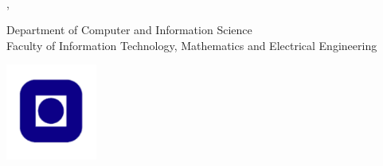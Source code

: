 \clearpage
\begin{titlepage}
    \noindent {\large \textbf{\thesisAuthor}}
    \vspace{2cm}
    
    \noindent {\Huge \thesisTitle} \\
    \noindent {\Large \it \thesisSubTitle}
    \vspace{2cm}
    
    \noindent \thesisType, \thesisDate 
    \vspace{2cm}
    
    \noindent Department of Computer and Information Science\\ Faculty of Information Technology, Mathematics and Electrical Engineering\\
    
    \vfill
    \begin{center}
    \includegraphics[width=3cm]{fig/NTNUlogo.pdf}
    \end{center}
\end{titlepage}
\cleardoublepage
%
%
%
%
%
